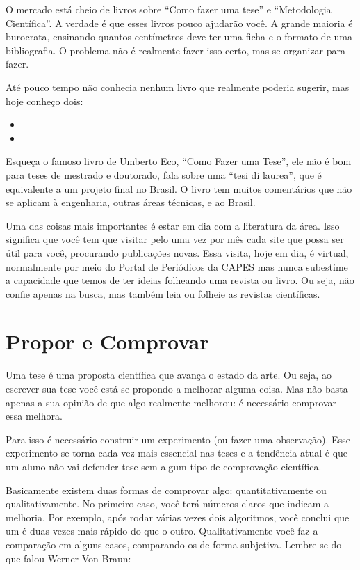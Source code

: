 O mercado está cheio de livros sobre ``Como fazer uma tese'' e ``Metodologia Científica''. A verdade é que esses livros pouco ajudarão você. A grande maioria é burocrata, ensinando quantos centímetros deve ter uma ficha e o formato de uma bibliografia. O problema não é realmente fazer isso certo, mas se organizar para fazer. 

Até pouco tempo não conhecia nenhum livro que realmente poderia sugerir, mas hoje conheço dois:
\begin{itemize}
    \item {}
    \item {}
\end{itemize}
	
Esqueça o famoso livro de Umberto Eco, ``Como Fazer uma Tese'', ele não é bom para teses de mestrado e doutorado, fala sobre uma ``tesi di laurea'', que é equivalente a um projeto final no Brasil. O livro tem muitos comentários que não se aplicam à engenharia, outras áreas técnicas, e ao Brasil. 

Uma das coisas mais importantes é estar em dia com a literatura da área. Isso significa que você tem que visitar pelo uma vez por mês cada site que possa ser útil para você, procurando publicações novas. Essa visita, hoje em dia, é virtual, normalmente por meio do Portal de Periódicos da CAPES mas nunca subestime a capacidade que temos de ter ideias folheando uma revista ou livro. 
Ou seja, não confie apenas na busca, mas também leia ou folheie as revistas científicas.



\section{Propor e Comprovar}

Uma tese é uma proposta científica que avança o estado da arte. Ou seja, ao escrever sua tese você está se propondo a melhorar alguma coisa. Mas não basta apenas a sua opinião de que algo realmente melhorou: é necessário comprovar essa melhora.

Para isso é necessário construir um experimento (ou fazer uma observação). Esse experimento se torna cada vez mais essencial nas teses e a tendência atual é que um aluno não vai defender tese sem algum tipo de comprovação científica.

Basicamente existem duas formas de comprovar algo: quantitativamente ou qualitativamente. No primeiro caso, você terá números claros que indicam a melhoria. Por exemplo, após rodar várias vezes dois algoritmos, você conclui que um é duas vezes mais rápido do que o outro. Qualitativamente você faz a comparação em alguns casos, comparando-os de forma subjetiva.
Lembre-se do que falou Werner Von Braun:

